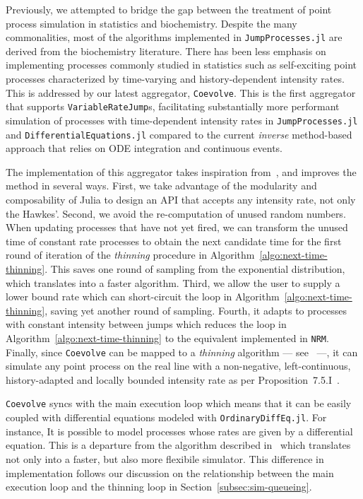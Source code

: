 \documentclass{juliacon}
\numberwithin{equation}{section}
\begin{document}
Previously, we attempted to bridge the gap between the treatment of point process simulation in statistics and biochemistry. Despite the many commonalities, most of the algorithms implemented in \texttt{JumpProcesses.jl} are derived from the biochemistry literature. There has been less emphasis on implementing processes commonly studied in statistics such as self-exciting point processes characterized by time-varying and history-dependent intensity rates. This is addressed by our latest aggregator, \texttt{Coevolve}. This is the first aggregator that supports \texttt{VariableRateJump}s, facilitating substantially more performant simulation of processes with time-dependent intensity rates in \texttt{JumpProcesses.jl} and \texttt{DifferentialEquations.jl} compared to the current \textit{inverse} method-based approach that relies on ODE integration and continuous events. 

The implementation of this aggregator takes  inspiration from~\cite{farajtabar2017}, and improves the method in several ways. First, we take advantage of the modularity and composability of Julia to design an API that accepts any intensity rate, not only the Hawkes'. Second, we avoid the re-computation of unused random numbers. When updating processes that have not yet fired, we can transform the unused time of constant rate processes to obtain the next candidate time for the first round of iteration of the \textit{thinning} procedure in Algorithm~\ref{algo:next-time-thinning}. This saves one round of sampling from the exponential distribution, which translates into a faster algorithm. Third, we allow the user to supply a lower bound rate which can short-circuit the loop in Algorithm~\ref{algo:next-time-thinning}, saving yet another round of sampling. Fourth, it adapts to processes with constant intensity between jumps which reduces the loop in Algorithm~\ref{algo:next-time-thinning} to the equivalent implemented in \texttt{NRM}. Finally, since \texttt{Coevolve} can be mapped to a \textit{thinning} algorithm --- see~\cite{farajtabar2017} ---, it can simulate any point process on the real line with a non-negative, left-continuous, history-adapted and locally bounded intensity rate as per Proposition~7.5.I~\cite{daley2003}.

\texttt{Coevolve} syncs with the main execution loop which means that it can be easily coupled with differential equations modeled with \texttt{OrdinaryDiffEq.jl}. For instance, It is possible to model processes whose rates are given by a differential equation. This is a departure from the algorithm described in~\cite{farajtabar2017} which translates not only into a faster, but also more flexibile simulator. This difference in implementation follows our discussion on the relationship between the main execution loop and the thinning loop in Section~\ref{subsec:sim-queueing}.
\end{document}
